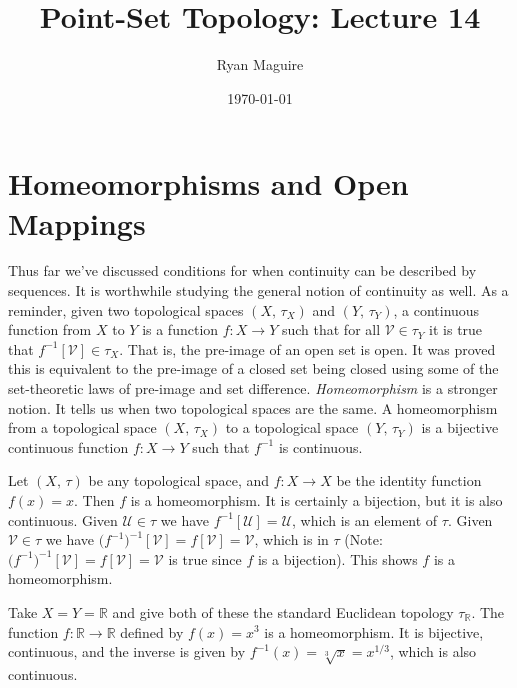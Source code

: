 \documentclass{article}
\title{Point-Set Topology: Lecture 14}
\author{Ryan Maguire}
\date{\today}
\theoremstyle{plain}
\theoremstyle{normal}
\newenvironment{example}{%
    \pushQED{\qed}\renewcommand{\qedsymbol}{$\blacksquare$}\examplex%
}{%
    \popQED\endexamplex%
}
\newenvironment{definition}{%
    \pushQED{\qed}\renewcommand{\qedsymbol}{$\blacksquare$}\definitionx%
}{%
    \popQED\enddefinitionx%
}
\begin{document}
    \maketitle
    \section{Homeomorphisms and Open Mappings}
        Thus far we've discussed conditions for when continuity can be
        described by sequences. It is worthwhile studying the general notion
        of continuity as well. As a reminder, given two topological spaces
        $(X,\,\tau_{X})$ and $(Y,\,\tau_{Y})$, a continuous function from $X$
        to $Y$ is a function $f:X\rightarrow{Y}$ such that for all
        $\mathcal{V}\in\tau_{Y}$ it is true that
        $f^{-1}[\mathcal{V}]\in\tau_{X}$. That is, the pre-image of an open set
        is open. It was proved this is equivalent to the pre-image of a closed
        set being closed using some of the set-theoretic laws of pre-image and
        set difference. \textit{Homeomorphism} is a stronger notion. It tells
        us when two topological spaces are the same.
        \begin{definition}[\textbf{Homeomorphism}]
            A homeomorphism from a topological space $(X,\,\tau_{X})$ to a
            topological space $(Y,\,\tau_{Y})$ is a bijective continuous
            function $f:X\rightarrow{Y}$ such that $f^{-1}$ is continuous.
        \end{definition}
        \begin{example}
            Let $(X,\,\tau)$ be any topological space, and
            $f:X\rightarrow{X}$ be the identity function $f(x)=x$. Then $f$ is
            a homeomorphism. It is certainly a bijection, but it is also
            continuous. Given $\mathcal{U}\in\tau$ we have
            $f^{-1}[\mathcal{U}]=\mathcal{U}$, which is an element of $\tau$.
            Given $\mathcal{V}\in\tau$ we have
            $\big(f^{-1}\big)^{-1}[\mathcal{V}]=f[\mathcal{V}]=\mathcal{V}$,
            which is in $\tau$ (Note:
            $\big(f^{-1}\big)^{-1}[\mathcal{V}]=f[\mathcal{V}]=\mathcal{V}$
            is true since $f$ is a bijection). This shows $f$ is a
            homeomorphism.
        \end{example}
        \begin{example}
            Take $X=Y=\mathbb{R}$ and give both of these the standard Euclidean
            topology $\tau_{\mathbb{R}}$. The function
            $f:\mathbb{R}\rightarrow\mathbb{R}$ defined by $f(x)=x^{3}$ is
            a homeomorphism. It is bijective, continuous, and the inverse is
            given by $f^{-1}(x)=\sqrt[3]{x}=x^{1/3}$, which is also continuous.
        \end{example}
\end{document}
